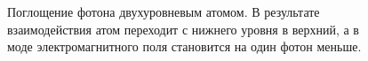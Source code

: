 \begin{figure}
\centering



\caption{Поглощение фотона двухуровневым атомом. В результате
  взаимодействия атом переходит с нижнего уровня в верхний, а в моде
  электромагнитного поля становится на один фотон меньше.}
\label{figPart1Ch2_3}
\end{figure}
